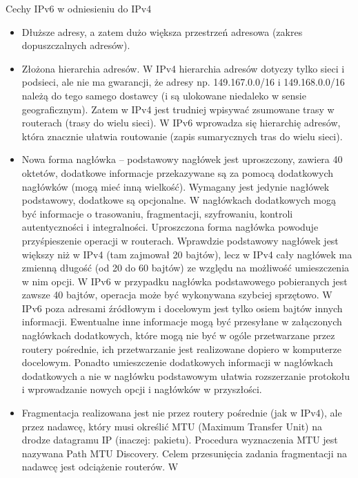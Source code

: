     Cechy IPv6 w odniesieniu do IPv4
    \begin{itemize}
        \item Dłuższe adresy, a zatem dużo większa przestrzeń adresowa (zakres dopuszczalnych
        adresów).
        \item Złożona hierarchia adresów. W IPv4 hierarchia adresów dotyczy tylko sieci i podsieci, ale
        nie ma gwarancji, że adresy np. 149.167.0.0/16 i 149.168.0.0/16 należą do tego samego
        dostawcy (i są ulokowane niedaleko w sensie geograficznym). Zatem w IPv4 jest trudniej
        wpisywać zsumowane trasy w routerach (trasy do wielu sieci). W IPv6 wprowadza się
        hierarchię adresów, która znacznie ułatwia routowanie (zapis sumarycznych tras do wielu
        sieci).
        \item Nowa forma nagłówka – podstawowy nagłówek jest uproszczony, zawiera 40 oktetów,
        dodatkowe informacje przekazywane są za pomocą dodatkowych nagłówków (mogą
        mieć inną wielkość). Wymagany jest jedynie nagłówek podstawowy, dodatkowe są
        opcjonalne. W nagłówkach dodatkowych mogą być informacje o trasowaniu,
        fragmentacji, szyfrowaniu, kontroli autentyczności i integralności. Uproszczona forma
        nagłówka powoduje przyśpieszenie operacji w routerach. Wprawdzie podstawowy
        nagłówek jest większy niż w IPv4 (tam zajmował 20 bajtów), lecz w IPv4 cały nagłówek
        ma zmienną długość (od 20 do 60 bajtów) ze względu na możliwość umieszczenia w nim
        opcji. W IPv6 w przypadku nagłówka podstawowego pobieranych jest zawsze 40 bajtów,
        operacja może być wykonywana szybciej sprzętowo. W IPv6 poza adresami źródłowym i
        docelowym jest tylko osiem bajtów innych informacji. Ewentualne inne informacje mogą
        być przesyłane w załączonych nagłówkach dodatkowych, które mogą nie być w ogóle
        przetwarzane przez routery pośrednie, ich przetwarzanie jest realizowane dopiero w
        komputerze docelowym. Ponadto umieszczenie dodatkowych informacji w nagłówkach
        dodatkowych a nie w nagłówku podstawowym ułatwia rozszerzanie protokołu i
        wprowadzanie nowych opcji i nagłówków w przyszłości.
        \item Fragmentacja realizowana jest nie przez routery pośrednie (jak w IPv4), ale przez
        nadawcę, który musi określić MTU (Maximum Transfer Unit) na drodze datagramu IP
        (inaczej: pakietu). Procedura wyznaczenia MTU jest nazywana Path MTU Discovery.
        Celem przesunięcia zadania fragmentacji na nadawcę jest odciążenie routerów. W

\end{itemize}
